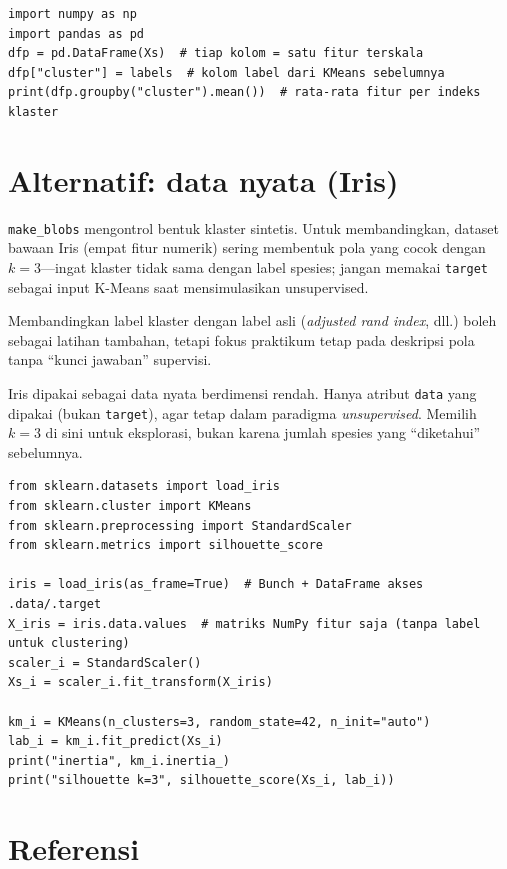 \documentclass[../main.tex]{subfiles}
\begin{document}
\begin{lstlisting}[caption=Profil cluster (rata-rata per fitur)]
import numpy as np
import pandas as pd
dfp = pd.DataFrame(Xs)  # tiap kolom = satu fitur terskala
dfp["cluster"] = labels  # kolom label dari KMeans sebelumnya
print(dfp.groupby("cluster").mean())  # rata-rata fitur per indeks klaster
\end{lstlisting}

\section{Alternatif: data nyata (Iris)}

\begin{catatan}
\texttt{make\_blobs} mengontrol bentuk klaster sintetis. Untuk membandingkan, dataset bawaan Iris (empat fitur numerik) sering membentuk pola yang cocok dengan $k=3$---ingat klaster tidak sama dengan label spesies; jangan memakai \texttt{target} sebagai input K-Means saat mensimulasikan unsupervised.
\end{catatan}

Membandingkan label klaster dengan label asli (\textit{adjusted rand index}, dll.) boleh sebagai latihan tambahan, tetapi fokus praktikum tetap pada deskripsi pola tanpa ``kunci jawaban'' supervisi.

\MulaiPenjelasanKode Iris dipakai sebagai data nyata berdimensi rendah. Hanya atribut \texttt{data} yang dipakai (bukan \texttt{target}), agar tetap dalam paradigma \textit{unsupervised}. Memilih $k=3$ di sini untuk eksplorasi, bukan karena jumlah spesies yang ``diketahui'' sebelumnya. \SelesaiPenjelasanKode

\begin{lstlisting}[caption={K-Means pada Iris (fitur saja, di-skala)}]
from sklearn.datasets import load_iris
from sklearn.cluster import KMeans
from sklearn.preprocessing import StandardScaler
from sklearn.metrics import silhouette_score

iris = load_iris(as_frame=True)  # Bunch + DataFrame akses .data/.target
X_iris = iris.data.values  # matriks NumPy fitur saja (tanpa label untuk clustering)
scaler_i = StandardScaler()
Xs_i = scaler_i.fit_transform(X_iris)

km_i = KMeans(n_clusters=3, random_state=42, n_init="auto")
lab_i = km_i.fit_predict(Xs_i)
print("inertia", km_i.inertia_)
print("silhouette k=3", silhouette_score(Xs_i, lab_i))
\end{lstlisting}

\section{Referensi}
\end{document}

